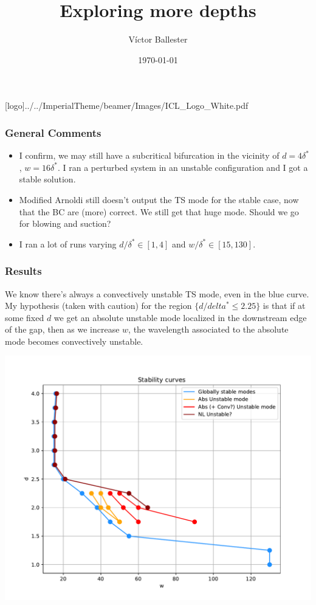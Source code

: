 \documentclass[
  aspectratio=169, %
  t, %
  onlytextwidth, %
  10pt, %
]{beamer}
\title{Exploring more depths} %
\subtitle{} %
\author{Víctor Ballester} %
\date{\today} %
\def\imagefolder{../../ImperialTheme/beamer/Images}
\begin{document}
\begingroup
{} %
[logo]{\imagefolder/ICL_Logo_White.pdf} %
\frame[plain, s]{\titlepage} %
\endgroup

\begin{frame}
	\frametitle{General Comments}
	\begin{itemize}
		\item I confirm, we may still have a subcritical bifurcation in the vicinity of $d = 4\delta^*$, $w = 16\delta^*$. I ran a perturbed system in an unstable
		      configuration and I got a stable solution.
		\item Modified Arnoldi still doesn't output the TS mode for the stable case, now that the BC are (more) correct. We still get that huge mode. Should we go for blowing and suction?
		\item I ran a lot of runs varying $d/\delta^* \in [ 1,4 ]$ and $w/\delta^* \in [ 15, 130 ]$.
	\end{itemize}
\end{frame}
\begin{frame}
	\frametitle{Results}
	We know there's always a convectively unstable TS mode, even in the blue curve. My hypothesis (taken with caution) for the region $\{d/delta^*\leq 2.25\}$ is that if at some fixed $d$ we get an absolute unstable mode localized in the downstream edge of the gap, then as we increase $w$, the wavelength associated to the absolute mode becomes convectively unstable. 
	
	\centering
	\includegraphics[width=0.5\linewidth]{Images/stabilitycurves.pdf}
\end{frame}
\end{document}
